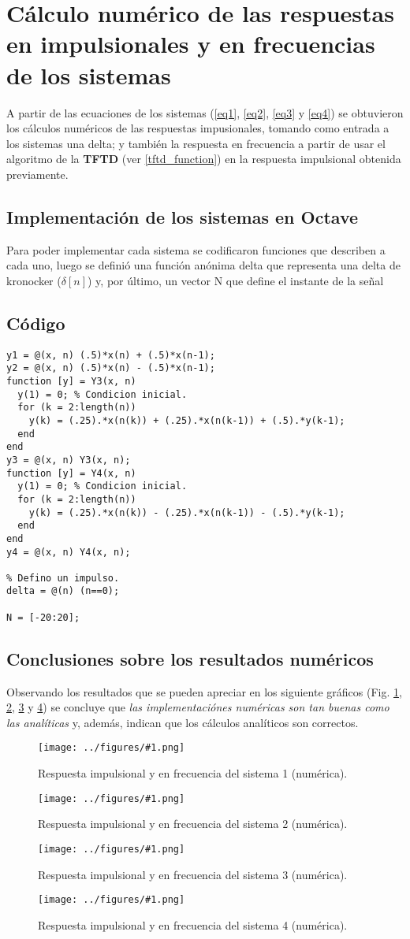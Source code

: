 \documentclass[letterpaper, 10 pt, conference]{ieeeconf}  %
\newcommand{\image}[2] {
  \begin{figure}[H]
    \centering
    \texttt{[image: ../figures/\#1.png]}
    \caption{#2}
    \label{fig:#1}
  \end{figure}
}
\begin{document}
\section{C\'alculo num\'erico de las respuestas en impulsionales y en frecuencias de los sistemas}
A partir de las ecuaciones de los sistemas (\ref{eq1}, \ref{eq2}, \ref{eq3} y \ref{eq4}) se obtuvieron los c\'alculos num\'ericos de las respuestas impusionales, tomando como entrada a los sistemas una delta; y tambi\'en la respuesta en frecuencia a partir de usar el algoritmo de la \textbf{TFTD} (ver \ref{tftd_function}) en la respuesta impulsional obtenida previamente.

\subsection{Implementaci\'on de los sistemas en Octave}
Para poder implementar cada sistema se codificaron funciones que describen a cada uno, luego se defini\'o una funci\'on an\'onima delta que representa una delta de kronocker ($\delta[n]$) y, por \'ultimo, un vector N que define el instante de la señal

\subsection{C\'odigo}
\begin{lstlisting}[style=Matlab-editor]
y1 = @(x, n) (.5)*x(n) + (.5)*x(n-1);
y2 = @(x, n) (.5)*x(n) - (.5)*x(n-1);
function [y] = Y3(x, n)
  y(1) = 0; % Condicion inicial.
  for (k = 2:length(n))
    y(k) = (.25).*x(n(k)) + (.25).*x(n(k-1)) + (.5).*y(k-1);
  end
end
y3 = @(x, n) Y3(x, n);
function [y] = Y4(x, n)
  y(1) = 0; % Condicion inicial.
  for (k = 2:length(n))
    y(k) = (.25).*x(n(k)) - (.25).*x(n(k-1)) - (.5).*y(k-1);
  end
end
y4 = @(x, n) Y4(x, n);

% Defino un impulso.
delta = @(n) (n==0);

N = [-20:20];

\end{lstlisting}

\subsection{Conclusiones sobre los resultados num\'ericos}
Observando los resultados que se pueden apreciar en los siguiente gr\'aficos (Fig. \ref{fig:num_resp_sist_1}, \ref{fig:num_resp_sist_2}, \ref{fig:num_resp_sist_3} y \ref{fig:num_resp_sist_4}) se concluye que \textit{las implementaci\'ones num\'ericas son tan buenas como las anal\'iticas} y, adem\'as, indican que los c\'alculos anal\'iticos son correctos.
\image{num_resp_sist_1}{Respuesta impulsional y en frecuencia del sistema 1 (num\'erica).}
\image{num_resp_sist_2}{Respuesta impulsional y en frecuencia del sistema 2 (num\'erica).}
\image{num_resp_sist_3}{Respuesta impulsional y en frecuencia del sistema 3 (num\'erica).}
\image{num_resp_sist_4}{Respuesta impulsional y en frecuencia del sistema 4 (num\'erica).}
\end{document}
